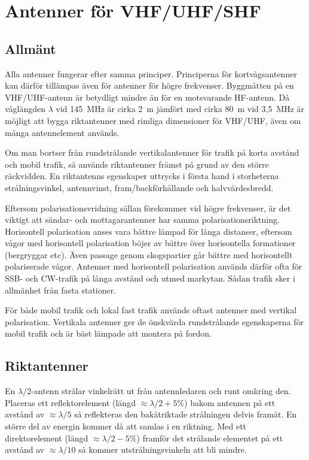 \section{Antenner för VHF/UHF/SHF}

\subsection{Allmänt}

Alla antenner fungerar efter samma principer.
Principerna för kortvågsantenner kan därför tillämpas även för antenner för
högre frekvenser.
Byggmåtten på en VHF/UHF-antenn är betydligt mindre än för en motsvarande
HF-antenn.
Då våglängden \(\lambda\) vid 145~MHz är cirka 2~m jämfört med cirka 80~m vid
3,5~MHz är möjligt att bygga riktantenner med rimliga dimensioner för VHF/UHF,
även om många antennelement används.

Om man bortser från rundstrålande vertikalantenner för trafik på korta avstånd
och mobil trafik, så används riktantenner främst på grund av den större
räckvidden.
En riktantenns egenskaper uttrycks i första hand i storheterna strålningsvinkel,
antennvinst, fram/backförhållande och halvvärdesbredd.

Eftersom polarisationsvridning sällan förekommer vid högre frekvenser, är det
viktigt att sändar- och mottagarantenner har samma polarisationsriktning.
Horisontell polarisation anses vara bättre lämpad för långa distanser, eftersom
vågor med horisontell polarisation böjer av bättre över horisontella
formationer (bergryggar etc).
Även passage genom skogspartier går bättre med horisontellt polariserade vågor.
Antenner med horisontell polarisation används därför ofta för SSB- och
CW-trafik på långa avstånd och utmed markytan.
Sådan trafik sker i allmänhet från fasta stationer.

För både mobil trafik och lokal fast trafik används oftast antenner med vertikal
polarisation.
Vertikala antenner ger de önskvärda rundstrålande egenskaperna för mobil trafik
och är bäst lämpade att montera på fordon.

\subsection{Riktantenner}
\label{riktantenn}

En \(\lambda/2\)-antenn strålar vinkelrätt ut från antennledaren och
runt omkring den.
Placeras ett reflektorelement (längd \(\approx\lambda/2 + 5\%\)) bakom antennen
på ett avstånd av \(\approx \lambda/5\) så reflekteras den bakåtriktade
strålningen delvis framåt.
En större del av energin kommer då att samlas i en riktning.
Med ett direktorelement (längd \(\approx\lambda/2 - 5\%\)) framför det
strålande elementet på ett avstånd av \(\approx\lambda/10\) så kommer
utstrålningsvinkeln att bli mindre.

